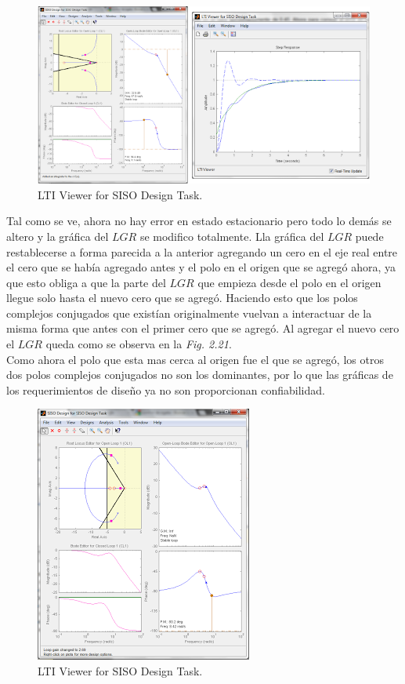 \documentclass[a4paper,12pt,twoside]{proyectotanquesecci}
\begin{document}
\begin{figure}[h]
\centering
\includegraphics[scale=0.7]{Ventana14}
\renewcommand{\figurename}{Fig.}
\caption{LTI Viewer for SISO Design Task.}
\label{LTI Viewer for SISO Design Task.}
\end{figure}

Tal como se ve, ahora no hay error en estado estacionario pero todo lo demás se altero y la gráfica del $LGR$ se modifico totalmente. Lla gráfica del $LGR$ puede restablecerse a forma parecida a la anterior agregando un cero en el eje real entre el cero que se había agregado antes y el polo en el origen que se agregó ahora, ya que esto obliga a que la parte del $LGR$ que empieza desde el polo en el origen llegue solo hasta el nuevo cero que se agregó. Haciendo esto que los polos complejos conjugados que existían originalmente vuelvan a interactuar de la misma forma que antes con el primer cero que se agregó. Al agregar el nuevo cero el $LGR$ queda como se observa en la \textit{Fig. 2.21}. \\

Como ahora el polo que esta mas cerca al origen fue el que se agregó, los otros dos polos complejos conjugados no son los dominantes, por lo que las gráficas de los requerimientos de diseño ya no son proporcionan confiabilidad. \\

\begin{figure}[h]
\centering
\includegraphics[scale=0.7]{Ventana15}
\renewcommand{\figurename}{Fig.}
\caption{LTI Viewer for SISO Design Task.}
\label{LTI Viewer for SISO Design Task.}
\end{figure}
\end{document}
